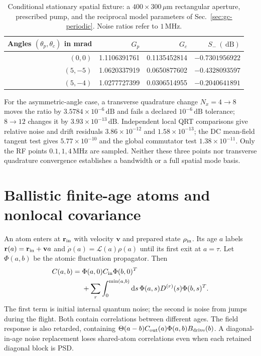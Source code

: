 \documentclass[11pt,a4paper]{article}
\newcommand{\dd}{\mathrm d}
\newcommand{\MHz}{\,\mathrm{MHz}}
\newcommand{\dB}{\,\mathrm{dB}}
\begin{document}
\begin{table}[ht]
\centering\small
\caption{Conditional stationary spatial fixture: a $400\times300\,\mu\mathrm m$
rectangular aperture, prescribed pump, and the reciprocal model parameters of
Sec.~\ref{sec:gc-periodic}. Noise ratios refer to $1\MHz$.}
\label{tab:gc-spatial}
\begin{tabular}{rrrr}
\toprule
Angles $(\theta_p,\theta_c)$ in mrad&$G_p$&$G_c$&$S_-\ (\dB)$\\
\midrule
$(0,0)$&1.1106391761&0.1135452814&$-0.7301956922$\\
$(5,-5)$&1.0620337919&0.0650877602&$-0.4328093597$\\
$(5,-4)$&1.0277727399&0.0306514955&$-0.2040641891$\\
\bottomrule
\end{tabular}
\end{table}
For the asymmetric-angle case, a transverse quadrature change $N_x=4\to8$
moves the ratio by $3.5784\times10^{-6}\dB$ and fails a declared
$10^{-6}\dB$ tolerance; $8\to12$ changes it by $3.93\times10^{-13}\dB$.
Independent local QRT comparisons give relative noise and drift residuals
$3.86\times10^{-12}$ and $1.58\times10^{-13}$; the DC mean-field tangent
test gives $5.77\times10^{-10}$ and the global commutator test
$1.38\times10^{-11}$. Only the RF points $0.1,1,4\MHz$ are sampled. Neither
these three points nor transverse quadrature convergence establishes a
bandwidth or a full spatial mode basis.

\section{Ballistic finite-age atoms and nonlocal covariance}
\label{sec:gc-transport}

An atom enters at $\mathbf r_{\rm in}$ with velocity $\mathbf v$ and
prepared state $\rho_{\rm in}$. Its age $a$ labels
$\mathbf r(a)=\mathbf r_{\rm in}+\mathbf va$ and
$\dot\rho(a)=\mathcal L(a)\rho(a)$ until its first exit at $a=\tau$.
Let $\Phi(a,b)$ be the atomic fluctuation propagator. Then
\begin{align}
 C(a,b)={}&\Phi(a,0)C_{\rm in}\Phi(b,0)^T\nonumber\\
 &+\sum_r\int_0^{\min(a,b)}\dd s\,
      \Phi(a,s)D^{(r)}(s)\Phi(b,s)^T.
 \label{eq:gc-transport-covariance}
\end{align}
The first term is initial internal quantum noise; the second is noise from
jumps during the flight. Both contain correlations between different ages.
The field response is also retarded, containing
$\Theta(a-b)C_{\rm out}(a)\Phi(a,b)B_{\rm drive}(b)$. A diagonal-in-age
noise replacement loses shared-atom correlations even when each retained
diagonal block is PSD.
\end{document}
